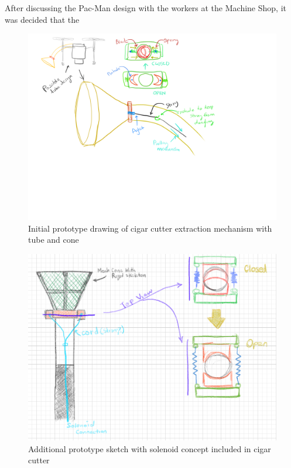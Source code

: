 \documentclass{wrcecapstone}
\begin{document}
After discussing the Pac-Man design with the workers at the Machine Shop, it was decided that the 
\begin{figure}
\begin{center}
\includegraphics[width=\columnwidth]{figures/fig736.png}
\end{center}
\caption{Initial prototype drawing of cigar cutter extraction mechanism with tube and cone}
\label{fig:7.3.6}
\end{figure}
\begin{figure}
\begin{center}
\includegraphics[width=\columnwidth]{figures/fig737.png}
\end{center}
\caption{Additional prototype sketch with solenoid concept included in cigar cutter}
\label{fig:7.3.7}
\end{figure}
\end{document}
